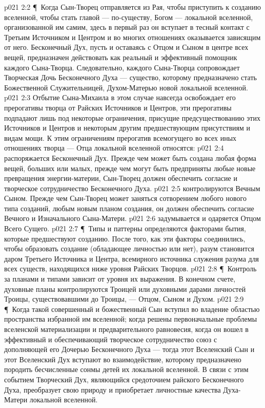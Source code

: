 \vs p021 2:2 \P\ Когда Сын\hyp{}Творец отправляется из Рая, чтобы приступить к созданию вселенной, чтобы стать главой --- по\hyp{}существу, Богом --- локальной вселенной, организованной им самим, здесь в первый раз он вступает в тесный контакт с Третьим Источником и Центром и во многих отношениях оказывается зависящим от него. Бесконечный Дух, пусть и оставаясь с Отцом и Сыном в центре всех вещей, предназначен действовать как реальный и эффективный помощник каждого Сына\hyp{}Творца. Следовательно, каждого Сына\hyp{}Творца сопровождает Творческая Дочь Бесконечного Духа --- существо, которому предназначено стать Божественной Служительницей, Духом\hyp{}Матерью новой локальной вселенной.
\vs p021 2:3 Отбытие Сына\hyp{}Михаила в этом случае навсегда освобождает его прерогативы творца от Райских Источников и Центров, эти прерогативы подпадают лишь под некоторые ограничения, присущие предсуществованию этих Источников и Центров и некоторым другим предшествующим присутствиям и видам мощи. К этим ограничениям прерогатив всемогущего во всех иных отношениях творца --- Отца локальной вселенной относятся:
\vs p021 2:4 \bibnobreakspace {} распоряжается Бесконечный Дух. Прежде чем может быть создана любая форма вещей, больших или малых, прежде чем могут быть предприняты любые новые превращения энергии\hyp{}материи, Сын\hyp{}Творец должен обеспечить согласие и творческое сотрудничество Бесконечного Духа.
\vs p021 2:5 \bibnobreakspace {} контролируются Вечным Сыном. Прежде чем Сын\hyp{}Творец может заняться сотворением любого нового типа созданий, любым новым планом создания, он должен обеспечить согласие Вечного и Изначального Сына\hyp{}Матери.
\vs p021 2:6 \bibnobreakspace {} задумывается и одаряется Отцом Всего Сущего.
\vs p021 2:7 \P\ Типы и паттерны  определяются факторами бытия, которые предшествуют созданию. После того, как эти факторы соединились, чтобы образовать создание (обладающее личностью или нет), разум становится даром Третьего Источника и Центра, всемирного источника служения разума для всех существ, находящихся ниже уровня Райских Творцов.
\vs p021 2:8 \P\ Контроль за планами и типами  зависит от уровня их выражения. В конечном счете, духовные планы контролируются Троицей или духовными дарами личностей Троицы, существовавшими до Троицы, --- Отцом, Сыном и Духом.
\vs p021 2:9 \P\ Когда такой совершенный и божественный Сын вступил во владение областью пространства избранной им вселенной; когда решены первоначальные проблемы вселенской материализации и предварительного равновесия, когда он вошел в эффективный и обеспечивающий творческое сотрудничество союз с дополняющей его Дочерью Бесконечного Духа --- тогда этот Вселенский Сын и этот Вселенский Дух вступают во взаимодействие, которому предназначено породить бесчисленные сонмы детей их локальной вселенной. В связи с этим событием Творческий Дух, являющийся средоточием райского Бесконечного Духа, преобразует свою природу и приобретает личностные качества Духа\hyp{}Матери локальной вселенной.
